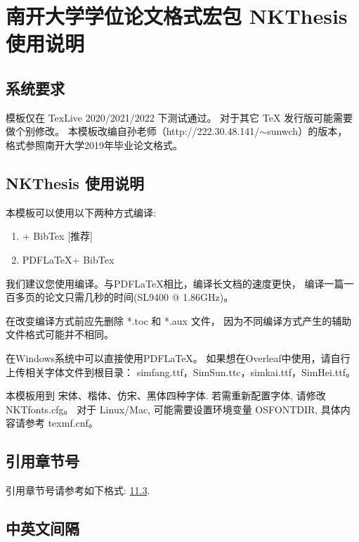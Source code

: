 
\chapter{南开大学学位论文格式宏包 NKThesis 使用说明} \label{chpt:A}

\section{系统要求}

模板仅在 TexLive 2020/2021/2022 下测试\XeLaTeX 通过。
对于其它 TeX 发行版可能需要做个别修改。
本模板改编自孙老师（http://222.30.48.141/$\sim$sunwch）的版本，
格式参照南开大学2019年毕业论文格式。

\section{NKThesis 使用说明}

本模板可以使用以下两种方式编译:
\begin{enumerate}
 \item \XeLaTeX + BibTex [推荐]
 \item PDF\LaTeX + BibTex
\end{enumerate}


我们建议您使用\XeLaTeX 编译。与PDF\LaTeX 相比，\XeLaTeX  编译长文档的速度更快，
编译一篇一百多页的论文只需几秒的时间(SL9400 @ 1.86GHz)。

在改变编译方式前应先删除 *.toc 和 *.aux 文件，
因为不同编译方式产生的辅助文件格式可能并不相同。


在Windows系统中可以直接使用PDF\LaTeX。
如果想在Overleaf中使用，请自行上传相关字体文件到根目录：
simfang.ttf，SimSun.ttc，simkai.ttf，SimHei.ttf。


本模板用到 宋体、楷体、仿宋、黑体四种字体. 若需重新配置字体, 请修改 NKTfonts.cfg。
对于 Linux/Mac, 可能需要设置环境变量 OSFONTDIR, 具体内容请参考 texmf.cnf。



\section{引用章节号}
\label{sec:ex:A}

引用章节号请参考如下格式: \ref{chpt:A}\ref{sec:ex:A}.


\section{中英文间隔}

